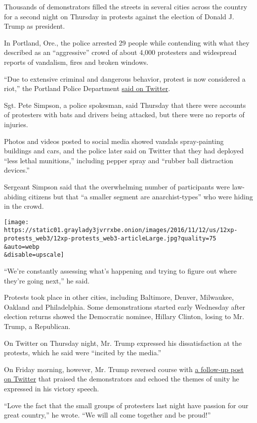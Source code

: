 Thousands of demonstrators filled the streets in several cities across
the country for a second night on Thursday in protests against the
election of Donald J. Trump as president.

In Portland, Ore., the police arrested 29 people while contending with
what they described as an ``aggressive'' crowd of about 4,000 protesters
and widespread reports of vandalism, fires and broken windows.

``Due to extensive criminal and dangerous behavior, protest is now
considered a riot,'' the Portland Police Department
\href{https://twitter.com/PortlandPolice/status/796933213008474112}{said
on Twitter}.

Sgt. Pete Simpson, a police spokesman, said Thursday that there were
accounts of protesters with bats and drivers being attacked, but there
were no reports of injuries.

Photos and videos posted to social media showed vandals spray-painting
buildings and cars, and the police later said on Twitter that they had
deployed ``less lethal munitions,'' including pepper spray and ``rubber
ball distraction devices.''

Sergeant Simpson said that the overwhelming number of participants were
law-abiding citizens but that ``a smaller segment are anarchist-types''
who were hiding in the crowd.

\texttt{[image: https://static01.graylady3jvrrxbe.onion/images/2016/11/12/us/12xp-protests\_web3/12xp-protests\_web3-articleLarge.jpg?quality=75\\\&auto=webp\\\&disable=upscale]}

``We're constantly assessing what's happening and trying to figure out
where they're going next,'' he said.

Protests took place in other cities, including Baltimore, Denver,
Milwaukee, Oakland and Philadelphia. Some demonstrations started early
Wednesday after election returns showed the Democratic nominee, Hillary
Clinton, losing to Mr. Trump, a Republican.

On Twitter on Thursday night, Mr. Trump expressed his dissatisfaction at
the protests, which he said were ``incited by the media.''

On Friday morning, however, Mr. Trump reversed course with
\href{https://twitter.com/realDonaldTrump/status/797034721075228672}{a
follow-up post on Twitter} that praised the demonstrators and echoed the
themes of unity he expressed in his victory speech.

``Love the fact that the small groups of protesters last night have
passion for our great country,'' he wrote. ``We will all come together
and be proud!''

